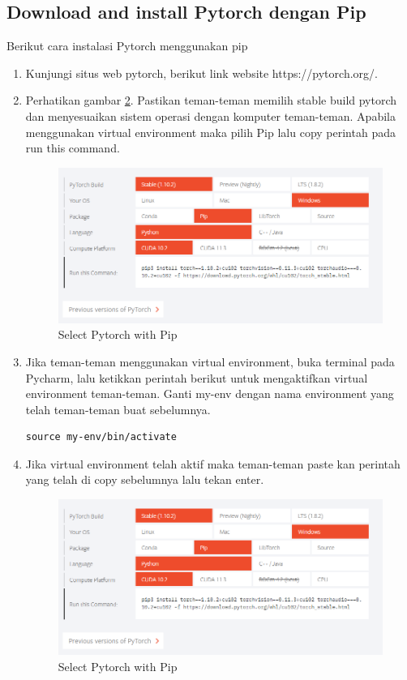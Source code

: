 \subsection{Download and install Pytorch dengan Pip}
Berikut cara instalasi Pytorch menggunakan pip
\begin{enumerate}
\item Kunjungi situs web pytorch, berikut link website https://pytorch.org/.

\item Perhatikan gambar \ref{pytorch2}. Pastikan teman-teman memilih stable build pytorch dan menyesuaikan sistem operasi dengan komputer teman-teman. Apabila menggunakan virtual environment maka pilih Pip lalu copy perintah pada run this command.
\begin{figure}[H]
\centering
\includegraphics[scale=.35]{figures/pytorch2}
\caption{Select Pytorch with Pip}
\label{pytorch2}
\end{figure}

\item Jika teman-teman menggunakan virtual environment, buka terminal pada Pycharm, lalu ketikkan perintah berikut untuk mengaktifkan virtual environment teman-teman. Ganti my-env dengan nama environment yang telah teman-teman buat sebelumnya.
\begin{verbatim}
source my-env/bin/activate
\end{verbatim}

\item Jika virtual environment telah aktif maka teman-teman paste kan perintah yang telah di copy sebelumnya lalu tekan enter.
\begin{figure}[H]
\centering
\includegraphics[scale=.35]{figures/pytorch2}
\caption{Select Pytorch with Pip}
\label{pytorch2}
\end{figure}


\end{enumerate}
